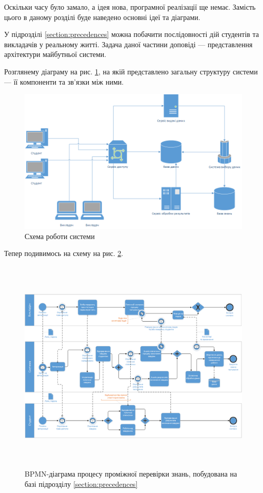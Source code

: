 Оскільки часу було замало, а ідея нова, програмної реалізації ще немає.
Замість цього в даному розділі буде наведено основні ідеї та діаграми.

У підрозділі \ref{section:precedences} можна побачити послідовності дій
студентів та викладачів у реальному житті.
Задача даної частини доповіді --- представлення архітектури майбутньої системи.

Розглянему діаграму на рис. \ref{fig:scheme_main}, на якій представлено загальну
структуру системи --- її компоненти та зв’язки між ними.

\begin{figure}[htbp]
    \center\includegraphics[width=\textwidth]{images/scheme_main.png}
    \caption{Схема роботи системи}
    \label{fig:scheme_main}
\end{figure}

Тепер подивимось на схему на рис. \ref{fig:bpmn_tests}.

\begin{figure}[h!]
    \center\includegraphics[height=28em,angle=-90]{images/bpmn_tests.png}
    \caption{BPMN-діаграма процесу проміжної перевірки знань,
    побудована на базі підрозділу \ref{section:precedences}}
    \label{fig:bpmn_tests}
\end{figure}

